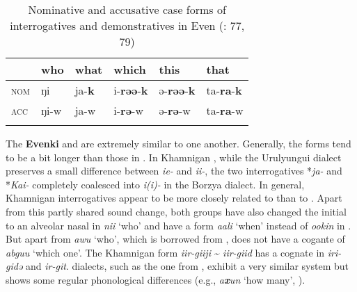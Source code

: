 \begin{table}
\caption{Nominative and accusative case forms of interrogatives and demonstratives in Even (\citealt{Benzing1955}: 77, 79)}
\label{tab:tungu:12}

\begin{tabularx}{\textwidth}{XXXXXl}
\lsptoprule
& \textbf{who} & \textbf{what} & \textbf{which} & \textbf{this} & \textbf{that}\\
\midrule
\textsc{nom} & ŋi & ja-\textbf{k} & i-\textbf{rəə}-\textbf{k} & ə-\textbf{rəə}-\textbf{k} & ta-\textbf{ra}-\textbf{k}\\
\textsc{acc} & ŋi-w & ja-w & i-\textbf{rə}-w & ə-\textbf{rə}-w & ta-\textbf{ra}-w\\
\lspbottomrule
\end{tabularx}
\end{table}

The \textbf{Evenki} and   are extremely similar to one another. Generally, the forms tend to be a bit longer than those in . In Khamnigan , while the Urulyungui dialect preserves a small difference between \textit{ie-} and \textit{ii-}, the two interrogatives *\textit{ja-} and *\textit{Kai-} completely coalesced into \textit{i(i)-} in the Borzya dialect. In general, Khamnigan  interrogatives appear to be more closely related to  than to . Apart from this partly shared sound change, both groups have also changed the initial  to an alveolar nasal in \textit{nii} ‘who’ and have a form \textit{aali} ‘when’ instead of \textit{ookin} in . But apart from \textit{awu} ‘who’, which is borrowed from ,  does not have a cogante of \textit{abguu} ‘which one’. The Khamnigan form \textit{iir-giiji} {\textasciitilde} \textit{iir-giid} has a cognate in  \textit{iri-}\textit{gidə} and  \textit{ir-git}.  dialects, such as the one from , exhibit a very similar  system but shows some regular phonological differences (e.g., \textit{a\textbf{x}un} ‘how many’, \citealt{BulatovaCotrozzi2004,Atknine1997}).

